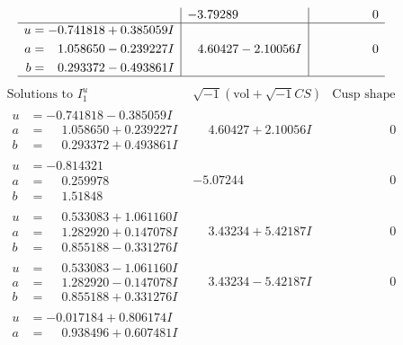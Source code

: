 \documentclass[1p]{elsarticle_modified}
\theoremstyle{definition}
\newcommand{\I}{\sqrt{-1}}
\begin{document}
$$\begin{array}{c|c|c}
 & -3.79289\phantom{ +0.000000I} & \phantom{-0.000000 } 0 \\ \hline\begin{aligned}
u &= -0.741818 + 0.385059 I \\
a &= \phantom{-}1.058650 - 0.239227 I \\
b &= \phantom{-}0.293372 - 0.493861 I\end{aligned}
 & \phantom{-}4.60427 - 2.10056 I & \phantom{-0.000000 } 0\\
 \hline 
 \end{array}$$\newpage$$\begin{array}{c|c|c}  
\text{Solutions to }I^u_{1}& \I (\text{vol} + \sqrt{-1}CS) & \text{Cusp shape}\\
 \hline 
\begin{aligned}
u &= -0.741818 - 0.385059 I \\
a &= \phantom{-}1.058650 + 0.239227 I \\
b &= \phantom{-}0.293372 + 0.493861 I\end{aligned}
 & \phantom{-}4.60427 + 2.10056 I & \phantom{-0.000000 } 0 \\ \hline\begin{aligned}
u &= -0.814321\phantom{ +0.000000I} \\
a &= \phantom{-}0.259978\phantom{ +0.000000I} \\
b &= \phantom{-}1.51848\phantom{ +0.000000I}\end{aligned}
 & -5.07244\phantom{ +0.000000I} & \phantom{-0.000000 } 0 \\ \hline\begin{aligned}
u &= \phantom{-}0.533083 + 1.061160 I \\
a &= \phantom{-}1.282920 + 0.147078 I \\
b &= \phantom{-}0.855188 - 0.331276 I\end{aligned}
 & \phantom{-}3.43234 + 5.42187 I & \phantom{-0.000000 } 0 \\ \hline\begin{aligned}
u &= \phantom{-}0.533083 - 1.061160 I \\
a &= \phantom{-}1.282920 - 0.147078 I \\
b &= \phantom{-}0.855188 + 0.331276 I\end{aligned}
 & \phantom{-}3.43234 - 5.42187 I & \phantom{-0.000000 } 0 \\ \hline\begin{aligned}
u &= -0.017184 + 0.806174 I \\
a &= \phantom{-}0.938496 + 0.607481 I \\

\end{aligned}
\end{array}$$
\end{document}
